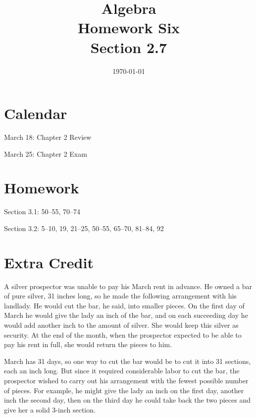 \documentclass[letterpaper, landscape]{exam}
\title{Algebra \\ Homework Six \\ Section 2.7 }
\author{}
\date{\today}
\begin{document}
    \maketitle

    \ifprintanswers{}
    \else
        \section{Calendar}

        \begin{itemize*}
            \item March 18: Chapter 2 Review
            \item March 25: Chapter 2 Exam
        \end{itemize*}
    \fi

    \section{Homework}

    \begin{itemize*}
        \item Section 3.1: 50--55, 70--74
        \item Section 3.2: 5--10, 19, 21--25, 50--55, 65--70, 81--84, 92
    \end{itemize*}

    \section{Extra Credit}

    A silver prospector was unable to pay his March rent in advance.  He owned a bar of pure silver, 31 inches long, so he
    made the following arrangement with his landlady.  He would cut the bar, he said, into smaller pieces.  On the first day
    of March he would give the lady an inch of the bar, and on each succeeding day he would add another inch to the amount
    of silver.  She would keep this silver as security.  At the end of the month, when the prospector expected to be able to
    pay his rent in full, she would return the pieces to him.

    March has 31 days, so one way to cut the bar would be to cut it into 31 sections, each an inch long.  But since it
    required considerable labor to cut the bar, the prospector wished to carry out his arrangement with the fewest possible
    number of pieces.  For example, he might give the lady an inch on the first day, another inch the second day, then on
    the third day he could take back the two pieces and give her a solid 3-inch section.
\end{document}
